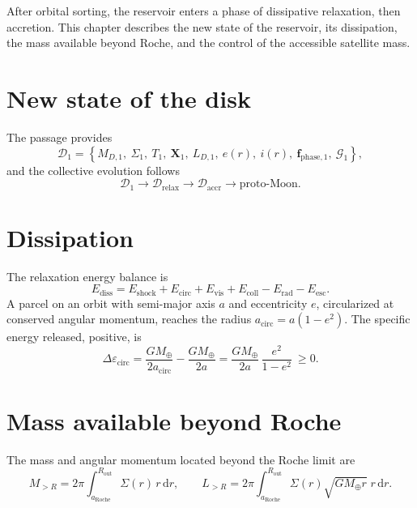 \documentclass[11pt,a4paper,openany]{report}
\newcommand{\Mt}{M_{\oplus}}
\newcommand{\aR}{a_{\mathrm{Roche}}}
\newcommand{\dd}{\mathrm{d}}
\begin{document}
After orbital sorting, the reservoir enters a phase of dissipative relaxation, then accretion. This
chapter describes the new state of the reservoir, its dissipation, the mass available beyond Roche,
and the control of the accessible satellite mass.

\section{New state of the disk}

The passage provides
\begin{equation}
\mathcal{D}_1=\left\{M_{D,1},\ \Sigma_1,\ T_1,\ \mathbf{X}_1,\ L_{D,1},\ e(r),\ i(r),\
\mathbf{f}_{\mathrm{phase},1},\ \mathcal{G}_1\right\},
\label{eq:D1}
\end{equation}
and the collective evolution follows
\begin{equation}
\mathcal{D}_1\longrightarrow\mathcal{D}_{\mathrm{relax}}\longrightarrow\mathcal{D}_{\mathrm{accr}}
\longrightarrow\text{proto-Moon}.
\label{eq:evolution}
\end{equation}

\section{Dissipation}

The relaxation energy balance is
\begin{equation}
E_{\mathrm{diss}}=E_{\mathrm{shock}}+E_{\mathrm{circ}}+E_{\mathrm{vis}}+E_{\mathrm{coll}}
-E_{\mathrm{rad}}-E_{\mathrm{esc}}.
\label{eq:Ediss}
\end{equation}
A parcel on an orbit with semi-major axis $a$ and eccentricity $e$, circularized at conserved
angular momentum, reaches the radius $a_{\mathrm{circ}}=a(1-e^2)$. The specific energy released,
positive, is
\begin{equation}
\Delta\varepsilon_{\mathrm{circ}}=\frac{G\Mt}{2a_{\mathrm{circ}}}-\frac{G\Mt}{2a}
=\frac{G\Mt}{2a}\,\frac{e^2}{1-e^2}\ \ge0.
\label{eq:circ}
\end{equation}

\section{Mass available beyond Roche}

The mass and angular momentum located beyond the Roche limit are
\begin{equation}
M_{>R}=2\pi\int_{\aR}^{R_{\mathrm{out}}}\Sigma(r)\,r\,\dd r,
\qquad
L_{>R}=2\pi\int_{\aR}^{R_{\mathrm{out}}}\Sigma(r)\sqrt{G\Mt r}\;r\,\dd r.
\label{eq:MR}
\end{equation}
\end{document}
